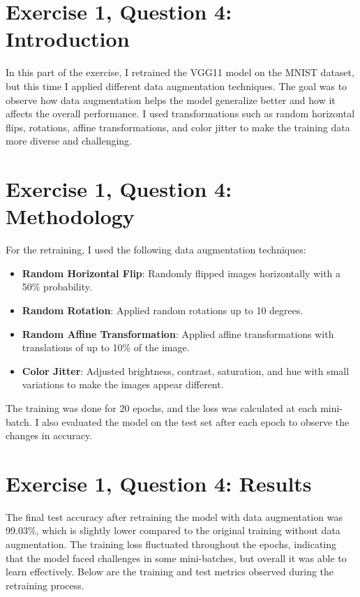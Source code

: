 \documentclass[10pt,letter,notitlepage]{article}
\newcounter{exercise}
\begin{document}
\begin{center}
\section{Exercise 1, Question 4: Introduction}
In this part of the exercise, I retrained the VGG11 model on the MNIST dataset, but this time I applied different data augmentation techniques. The goal was to observe how data augmentation helps the model generalize better and how it affects the overall performance. I used transformations such as random horizontal flips, rotations, affine transformations, and color jitter to make the training data more diverse and challenging.

\section{Exercise 1, Question 4: Methodology}
For the retraining, I used the following data augmentation techniques:
\begin{itemize}
    \item \textbf{Random Horizontal Flip}: Randomly flipped images horizontally with a 50\% probability.
    \item \textbf{Random Rotation}: Applied random rotations up to 10 degrees.
    \item \textbf{Random Affine Transformation}: Applied affine transformations with translations of up to 10\% of the image.
    \item \textbf{Color Jitter}: Adjusted brightness, contrast, saturation, and hue with small variations to make the images appear different.
\end{itemize}

The training was done for 20 epochs, and the loss was calculated at each mini-batch. I also evaluated the model on the test set after each epoch to observe the changes in accuracy.

\section{Exercise 1, Question 4: Results}
The final test accuracy after retraining the model with data augmentation was 99.03\%, which is slightly lower compared to the original training without data augmentation. The training loss fluctuated throughout the epochs, indicating that the model faced challenges in some mini-batches, but overall it was able to learn effectively. Below are the training and test metrics observed during the retraining process.


\end{center}
\end{document}
